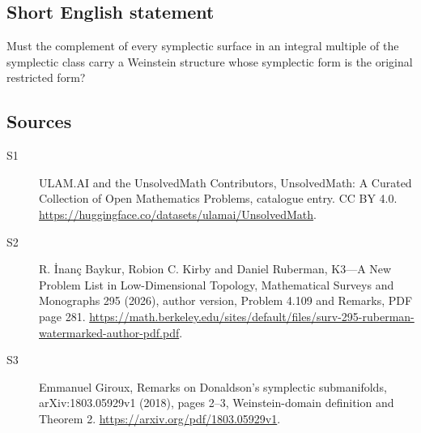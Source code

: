 \documentclass[11pt]{article}
\begin{document}
\subsection{Short English statement}
Must the complement of every symplectic surface in an integral multiple of the symplectic class carry a Weinstein structure whose symplectic form is the original restricted form?
\subsection{Sources}
\begin{description}
\item[\hypertarget{source:statement:1}{S1}] ULAM.AI and the UnsolvedMath Contributors, UnsolvedMath: A Curated Collection of Open Mathematics Problems, catalogue entry. CC BY 4.0. \url{https://huggingface.co/datasets/ulamai/UnsolvedMath}.
\item[\hypertarget{source:statement:2}{S2}] R. İnanç Baykur, Robion C. Kirby and Daniel Ruberman, K3—A New Problem List in Low-Dimensional Topology, Mathematical Surveys and Monographs 295 (2026), author version, Problem 4.109 and Remarks, PDF page 281. \url{https://math.berkeley.edu/sites/default/files/surv-295-ruberman-watermarked-author-pdf.pdf}.
\item[\hypertarget{source:statement:3}{S3}] Emmanuel Giroux, Remarks on Donaldson's symplectic submanifolds, arXiv:1803.05929v1 (2018), pages 2--3, Weinstein-domain definition and Theorem 2. \url{https://arxiv.org/pdf/1803.05929v1}.
\end{description}
\label{end:statement}
\end{document}

